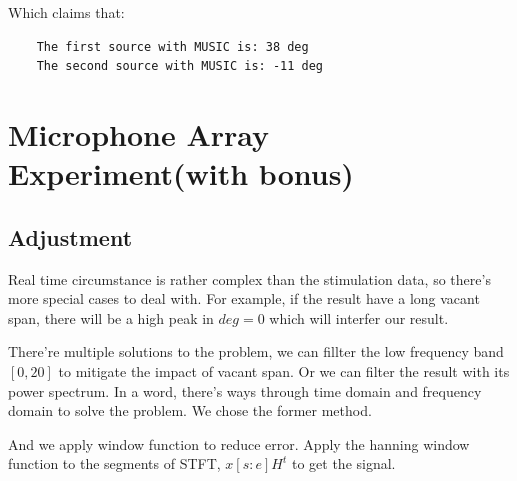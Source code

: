 \documentclass[UTF8]{article}
\begin{document}
Which claims that:
\begin{lstlisting}
    The first source with MUSIC is: 38 deg
    The second source with MUSIC is: -11 deg
\end{lstlisting}

\section{Microphone Array Experiment(with bonus)}
\subsection{Adjustment}
\hspace{0.5em} Real time circumstance is rather complex than the stimulation data, so there's more special cases to deal with. For example, if the result have a long vacant span, there will be a high peak in $deg = 0$ which will interfer our result.

There're multiple solutions to the problem, we can fillter the low frequency band $[0, 20]$ to mitigate the impact of vacant span. Or we can filter the result with its power spectrum. In a word, there's ways through time domain and frequency domain to solve the problem. We chose the former method.

And we apply window function to reduce error. Apply the hanning window function to the segments of STFT, $x[s:e]H^t$ to get the signal.
\end{document}
